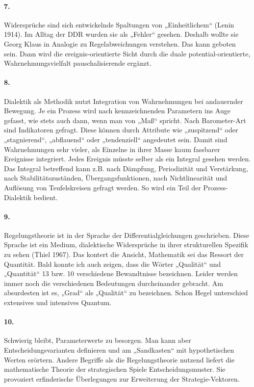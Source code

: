 \documentclass[a4paper,11pt]{article}
\begin{document}
\paragraph{7.}
Widersprüche sind sich entwickelnde Spaltungen von „Einheitlichem“ (Lenin
1914).  Im Alltag der DDR wurden sie als „Fehler“ gesehen. Deshalb wollte sie
Georg Klaus in Analogie zu Regelabweichungen verstehen. Das kann geboten sein.
Dann wird die ereignis-orientierte Sicht durch die duale
potential-orientierte, Wahrnehmungsvielfalt pauschalisierende ergänzt.

\paragraph{8.}
Dialektik als Methodik nutzt Integration von Wahrnehmungen bei andauernder
Bewegung. Je ein Prozess wird nach kennzeichnenden Parametern ins Auge
gefasst, wie stets auch dann, wenn man von „Maß“ spricht. Nach Barometer-Art
sind Indikatoren gefragt. Diese können durch Attribute wie „zuspitzend“ oder
„stagnierend“, „abflauend“ oder „tendenziell“ angedeutet sein.  Damit sind
Wahrnehmungen sehr vieler, als Einzelne in ihrer Masse kaum fassbarer
Ereignisse integriert. Jedes Ereignis müsste selber als ein Integral gesehen
werden. Das Integral betreffend kann z.B. nach Dämpfung, Periodizität und
Verstärkung, nach Stabilitätszuständen, Übergangsfunktionen, nach
Nichtlinearität und Auflösung von Teufelskreisen gefragt werden. So wird ein
Teil der Prozess-Dialektik bedient.

\paragraph{9.}
Regelungstheorie ist in der Sprache der Differentialgleichungen geschrieben.
Diese Sprache ist ein Medium, dialektische Widersprüche in ihrer strukturellen
Spezifik zu sehen (Thiel 1967). Das kontert die Ansicht, Mathematik sei das
Ressort der Quantität. Bald konnte ich auch zeigen, dass die Wörter „Qualität“
und „Quantität“ 13 bzw. 10 verschiedene Bewandtnisse bezeichnen. Leider werden
immer noch die verschiedenen Bedeutungen durcheinander gebracht. Am
absurdesten ist es, „Grad“ als „Qualität“ zu bezeichnen. Schon Hegel
unterschied extensives und intensives Quantum.

\paragraph{10.}
Schwierig bleibt, Parameterwerte zu besorgen. Man kann aber
Entscheidungsvarianten definieren und am „Sandkasten“ mit hypothetischen
Werten erörtern. Andere Begriffe als die Regelungstheorie nutzend liefert die
mathematische Theorie der strategischen Spiele Entscheidungsmuster. Sie
provoziert erfinderische Überlegungen zur Erweiterung der Strategie-Vektoren.
\end{document}
